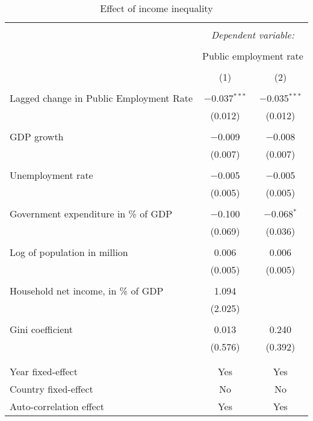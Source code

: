 
\begin{table}[!htbp] \centering 
  \caption{Effect of income inequality} 
  \label{} 
\begin{tabular}{@{\extracolsep{5pt}}lcc} 
\\[-1.8ex]\hline 
\hline \\[-1.8ex] 
 & \multicolumn{2}{c}{\textit{Dependent variable:}} \\ 
\cline{2-3} 
\\[-1.8ex] & \multicolumn{2}{c}{Public employment rate} \\ 
\\[-1.8ex] & (1) & (2)\\ 
\hline \\[-1.8ex] 
 Lagged change in Public Employment Rate & $-$0.037$^{***}$ & $-$0.035$^{***}$ \\ 
  & (0.012) & (0.012) \\ 
  & & \\ 
 GDP growth & $-$0.009 & $-$0.008 \\ 
  & (0.007) & (0.007) \\ 
  & & \\ 
 Unemployment rate & $-$0.005 & $-$0.005 \\ 
  & (0.005) & (0.005) \\ 
  & & \\ 
 Government expenditure in \% of GDP & $-$0.100 & $-$0.068$^{*}$ \\ 
  & (0.069) & (0.036) \\ 
  & & \\ 
 Log of population in million & 0.006 & 0.006 \\ 
  & (0.005) & (0.005) \\ 
  & & \\ 
 Household net income, in \% of GDP & 1.094 &  \\ 
  & (2.025) &  \\ 
  & & \\ 
 Gini coefficient & 0.013 & 0.240 \\ 
  & (0.576) & (0.392) \\ 
  & & \\ 
\hline \\[-1.8ex] 
Year fixed-effect & Yes & Yes \\ 
Country fixed-effect & No & No \\ 
Auto-correlation effect & Yes & Yes \\ 

\end{tabular}
\end{table}
